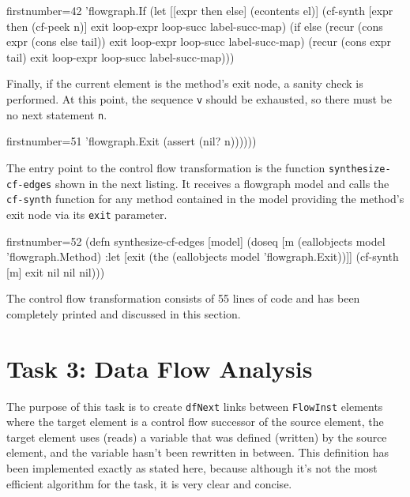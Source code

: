 \documentclass[11pt]{article}
\begin{document}
\begin{clojurecode*}{firstnumber=42}
        'flowgraph.If
                   (let [[expr then else] (econtents el)]
                     (cf-synth [expr then (cf-peek n)]
                               exit loop-expr loop-succ label-succ-map)
                     (if else
                       (recur (cons expr (cons else tail))
                              exit loop-expr loop-succ label-succ-map)
                       (recur (cons expr tail)
                              exit loop-expr loop-succ label-succ-map)))
\end{clojurecode*}

Finally, if the current element is the method's exit node, a sanity check is
performed.  At this point, the sequence \verb|v| should be exhausted, so there
must be no next statement \verb|n|.

\begin{clojurecode*}{firstnumber=51}
        'flowgraph.Exit (assert (nil? n))))))
\end{clojurecode*}

The entry point to the control flow transformation is the function
\verb|synthesize-cf-edges| shown in the next listing.  It receives a flowgraph
model and calls the \verb|cf-synth| function for any method contained in the
model providing the method's exit node via its \verb|exit| parameter.

\begin{clojurecode*}{firstnumber=52}
(defn synthesize-cf-edges [model]
  (doseq [m (eallobjects model 'flowgraph.Method)
          :let [exit (the (eallobjects model 'flowgraph.Exit))]]
    (cf-synth [m] exit nil nil nil)))
\end{clojurecode*}

The control flow transformation consists of 55 lines of code and has been
completely printed and discussed in this section.


\section{Task 3: Data Flow Analysis}
\label{sec:task-3}

The purpose of this task is to create \verb|dfNext| links between
\verb|FlowInst| elements where the target element is a control flow successor
of the source element, the target element uses (reads) a variable that was
defined (written) by the source element, and the variable hasn't been rewritten
in between.  This definition has been implemented exactly as stated here,
because although it's not the most efficient algorithm for the task, it is very
clear and concise.
\end{document}
